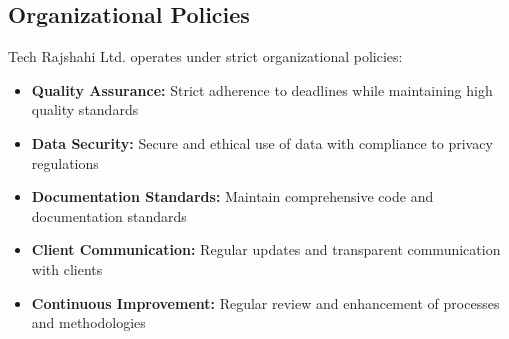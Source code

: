 \documentclass[12pt,a4paper]{article}
\begin{document}
\subsection{Organizational Policies}
Tech Rajshahi Ltd. operates under strict organizational policies:

\begin{itemize}
    \item \textbf{Quality Assurance:} Strict adherence to deadlines while maintaining high quality standards
    \item \textbf{Data Security:} Secure and ethical use of data with compliance to privacy regulations
    \item \textbf{Documentation Standards:} Maintain comprehensive code and documentation standards
    \item \textbf{Client Communication:} Regular updates and transparent communication with clients
    \item \textbf{Continuous Improvement:} Regular review and enhancement of processes and methodologies
\end{itemize}
\end{document}
